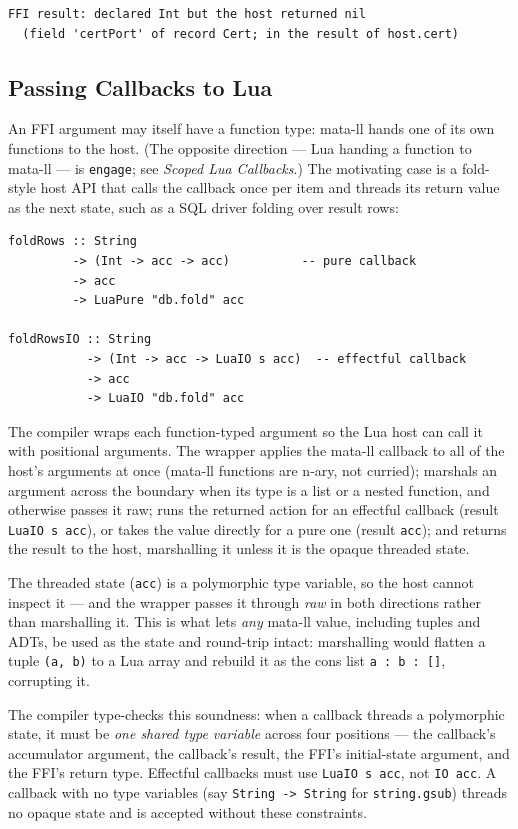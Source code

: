 \documentclass[11pt,a4paper]{article}
\begin{document}
\begin{lstlisting}[language={}]
FFI result: declared Int but the host returned nil
  (field 'certPort' of record Cert; in the result of host.cert)
\end{lstlisting}

\subsection{Passing Callbacks to Lua}
\label{sec:outcallbacks}

An FFI argument may itself have a function type: mata-ll hands one of
its own functions to the host.  (The opposite direction --- Lua handing
a function to mata-ll --- is \texttt{engage}; see \emph{Scoped Lua
Callbacks}.)  The motivating case is a fold-style host API that calls
the callback once per item and threads its return value as the next
state, such as a SQL driver folding over result rows:

\begin{lstlisting}
foldRows :: String
         -> (Int -> acc -> acc)          -- pure callback
         -> acc
         -> LuaPure "db.fold" acc

foldRowsIO :: String
           -> (Int -> acc -> LuaIO s acc)  -- effectful callback
           -> acc
           -> LuaIO "db.fold" acc
\end{lstlisting}

The compiler wraps each function-typed argument so the Lua host can
call it with positional arguments.  The wrapper applies the mata-ll
callback to all of the host's arguments at once (mata-ll functions are
n-ary, not curried); marshals an argument across the boundary when its
type is a list or a nested function, and otherwise passes it raw; runs
the returned action for an effectful callback (result \texttt{LuaIO s
acc}), or takes the value directly for a pure one (result
\texttt{acc}); and returns the result to the host, marshalling it
unless it is the opaque threaded state.

The threaded state (\texttt{acc}) is a polymorphic type variable, so
the host cannot inspect it --- and the wrapper passes it through
\emph{raw} in both directions rather than marshalling it.  This is
what lets \emph{any} mata-ll value, including tuples and ADTs, be used
as the state and round-trip intact: marshalling would flatten a tuple
\texttt{(a, b)} to a Lua array and rebuild it as the cons list
\texttt{a : b : []}, corrupting it.

The compiler type-checks this soundness: when a callback threads a
polymorphic state, it must be \emph{one shared type variable} across
four positions --- the callback's accumulator argument, the callback's
result, the FFI's initial-state argument, and the FFI's return type.
Effectful callbacks must use \texttt{LuaIO s acc}, not \texttt{IO acc}.
A callback with no type variables (say \texttt{String -> String} for
\texttt{string.gsub}) threads no opaque state and is accepted without
these constraints.
\end{document}
